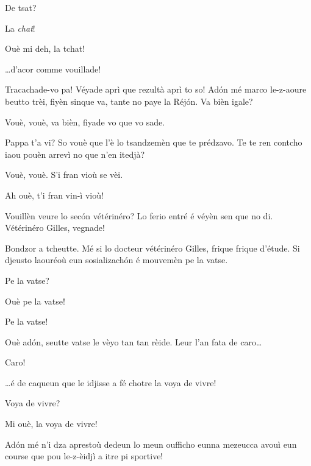 \begin{drama}
\Cienspeaks De tsat?

\Schulzspeaks La \textit{chat}!

\Mariettospeaks{} Ouè mi deh, la tchat!

\Cienspeaks{} \ldots d'acor comme vouillade!

\Schulzspeaks Tracachade-vo pa! Véyade aprì que rezultà aprì to so! Ad\'on mé marco le-z-aoure beutto trèi, fiyèn sinque va, tante no paye la Réjón. Va bièn igale?

\Cienspeaks Vouè, vouè, va bièn, fiyade vo que vo sade.



\Simonspeaks Pappa t’a vi? So vouè que l’è lo tsandzemèn que te prédzavo. Te te ren contcho iaou pouèn arrevì no que n’en itedjà?

\Cienspeaks Vouè, vouè. S’i fran vioù se vèi.

\Mariettospeaks Ah ouè, t'i fran vin-ì vioù!


\Chefspeaks Vouillèn veure lo sec\'on vétérinéro? Lo ferio entré é véyèn sen que no di. Vétérinéro Gilles, vegnade!


\Maracanaspeaks Bondzor a tcheutte. Mé si lo docteur vétérinéro Gilles, frique frique d’étude. Si djeusto laouréoù eun sosializach\'on é mouvemèn pe la vatse.

\Cienspeaks Pe la vatse?

\Maracanaspeaks Ouè pe la vatse!

\Mariettospeaks Pe la vatse!

\Maracanaspeaks Ouè ad\'on, seutte vatse le vèyo tan tan rèide. Leur l’an fata de caro\ldots

\Mariettospeaks Caro!

\Maracanaspeaks \ldots é de caqueun que le idjisse a fé chotre la voya de vivre!

\Cienspeaks Voya de vivre?

\Mariettospeaks{} Mi ouè, la voya de vivre!

\Maracanaspeaks  Ad\'on mé n’i dza aprestoù dedeun lo meun oufficho eunna mezeucca avouì eun course que pou le-z-èidjì a itre pi sportive!


\end{drama}
